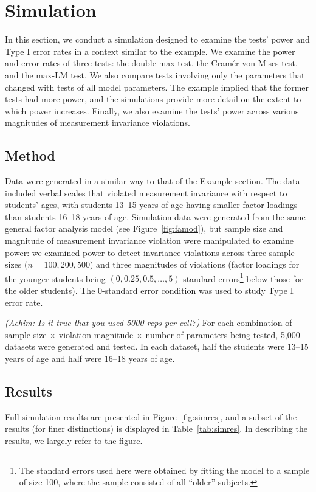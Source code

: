 \documentclass[man]{apa}
\newcommand{\readme}[1]{\emph{\marginpar{README} (#1)}}
\begin{document}
\section{Simulation}
In this section, we conduct a simulation designed to
examine the tests' power and Type I error rates in a context
similar to the example.
We examine the power and error rates of three tests: the double-max test, the
Cram\'{e}r-von Mises test, and the max-LM test.  We also compare 
tests involving only the parameters that changed with tests of all model
parameters.  The example implied that the former tests had more
power, and the simulations provide more detail on the extent to which
power increases.  Finally, we also examine the tests' power across
various magnitudes of measurement invariance violations.

\subsection{Method}
Data were generated in a similar way to that of 
the Example section.
The data included verbal scales that violated measurement invariance
with respect to students' ages, with students 13--15 years of age
having smaller factor loadings than students 16--18 years of age.  
Simulation data were generated from the same general factor analysis
model (see Figure~\ref{fig:famod}), but sample size and magnitude
of measurement 
invariance violation were manipulated to examine power:
we examined power to detect 
invariance violations across three sample sizes ($n=100,
200, 500$) and three magnitudes of violations (factor loadings
for the younger students being $(0, 0.25, 0.5, \dots, 5)$ standard
errors\footnote{The standard errors used here were
  obtained by fitting
  the model to a sample of size 100, where the sample consisted of all
  ``older'' subjects.} below 
those for the older students).  The 0-standard error condition was
used to study Type I error rate.

\readme{Achim: Is it true that you used 5000 reps per cell?}
For each combination of sample size $\times$
violation magnitude $\times$ number of parameters being tested,
5,000 datasets were generated and tested.  In each dataset, half the
students were 13--15 
years of age and half were 16--18 years of age.

\subsection{Results}
Full simulation results are presented in Figure~\ref{fig:simres}, and
a subset of the results (for finer distinctions) is displayed in
Table~\ref{tab:simres}.  In describing the results, we largely refer
to the figure.
\end{document}
